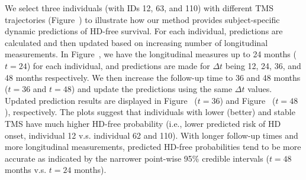 \documentclass[Crown, sagev, times, doublespace]{sagej}
\begin{document}
We select three individuals (with IDs 12, 63, and 110) with different TMS trajectories (Figure~) to illustrate how our method provides subject-specific dynamic predictions of HD-free survival. For each individual, predictions are calculated and then updated based on increasing number of longitudinal measurements. In Figure~, we have the longitudinal measures up to 24 months ($t=24$) for each individual, and predictions are made for $\Delta t$ being 12, 24, 36, and 48 months respectively. We then increase the follow-up time to 36 and 48 months ($t=36$ and $t=48$) and update the predictions using the same $\Delta t$ values. Updated prediction results are displayed in Figure~ ($t=36$) and Figure~ ($t=48$), respectively. The plots suggest that individuals with lower (better) and stable TMS have much higher HD-free probability (i.e., lower predicted risk of HD onset, individual 12 v.s. individual 62 and 110). With longer follow-up times and more longitudinal measurements, predicted HD-free probabilities tend to be more accurate as indicated by the narrower point-wise 95\% credible intervals ($t=48$ months v.s. $t=24$ months).

\begin{table}[ht]
\centering
\caption{PREDICT-HD data analysis: time-dependent AUC of the predictions of HD-free probability from QRJM and LMJM with TMS as the longitudinal biomarker.}
\label{tab:data_auc}
\end{table}
\end{document}
